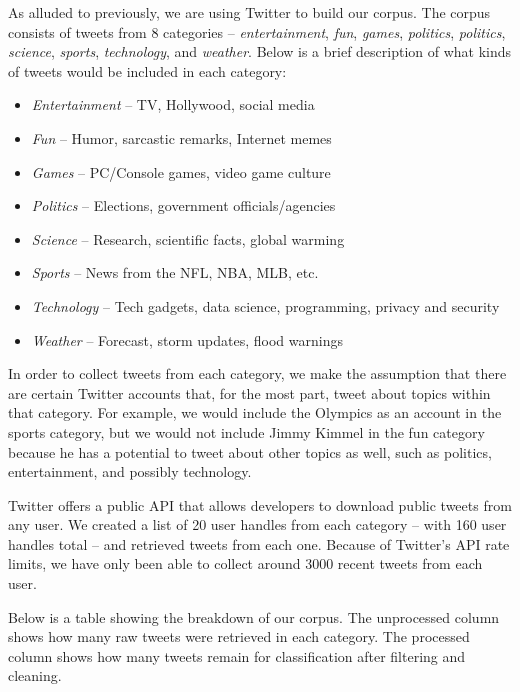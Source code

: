 \documentclass[twocolumn]{article}
\begin{document}
As alluded to previously, we are using Twitter to build our corpus. The corpus consists of tweets from 8 categories -- \textit{entertainment}, \textit{fun}, \textit{games}, \textit{politics}, \textit{politics}, \textit{science}, \textit{sports}, \textit{technology}, and \textit{weather}. Below is a brief description of what kinds of tweets would be included in each category:
\begin{itemize}
    \itemsep 0em
    \item \textit{Entertainment} -- TV, Hollywood, social media
    \item \textit{Fun} -- Humor, sarcastic remarks, Internet memes
    \item \textit{Games} -- PC/Console games, video game culture
    \item \textit{Politics} -- Elections, government officials/agencies
    \item \textit{Science} -- Research, scientific facts, global warming
    \item \textit{Sports} -- News from the NFL, NBA, MLB, etc.
    \item \textit{Technology} -- Tech gadgets, data science, programming, privacy and security
    \item \textit{Weather} -- Forecast, storm updates, flood warnings
\end{itemize}

In order to collect tweets from each category, we make the assumption that there are certain Twitter accounts that, for the most part, tweet about topics within that category. For example, we would include the Olympics as an account in the sports category, but we would not include Jimmy Kimmel in the fun category because he has a potential to tweet about other topics as well, such as politics, entertainment, and possibly technology.

Twitter offers a public API that allows developers to download public tweets from any user. We created a list of 20 user handles from each category -- with 160 user handles total -- and retrieved tweets from each one. Because of Twitter's API rate limits, we have only been able to collect around 3000 recent tweets from each user.

Below is a table showing the breakdown of our corpus. The unprocessed column shows how many raw tweets were retrieved in each category. The processed column shows how many tweets remain for classification after filtering and cleaning.
\end{document}
